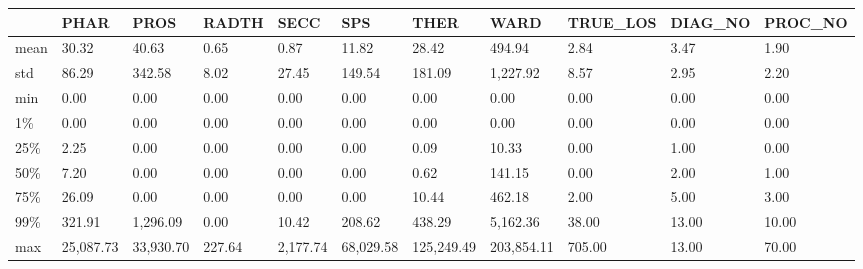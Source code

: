 \begin{tabular}{lllllllllll}
\toprule
{} &       PHAR &       PROS &   RADTH &      SECC &        SPS &        THER &        WARD & TRUE\_LOS & DIAG\_NO & PROC\_NO \\
\midrule
mean &      30.32 &      40.63 &    0.65 &      0.87 &      11.82 &       28.42 &      494.94 &     2.84 &    3.47 &    1.90 \\
std  &      86.29 &     342.58 &    8.02 &     27.45 &     149.54 &      181.09 &    1,227.92 &     8.57 &    2.95 &    2.20 \\
min  &       0.00 &       0.00 &    0.00 &      0.00 &       0.00 &        0.00 &        0.00 &     0.00 &    0.00 &    0.00 \\
1\%   &       0.00 &       0.00 &    0.00 &      0.00 &       0.00 &        0.00 &        0.00 &     0.00 &    0.00 &    0.00 \\
25\%  &       2.25 &       0.00 &    0.00 &      0.00 &       0.00 &        0.09 &       10.33 &     0.00 &    1.00 &    0.00 \\
50\%  &       7.20 &       0.00 &    0.00 &      0.00 &       0.00 &        0.62 &      141.15 &     0.00 &    2.00 &    1.00 \\
75\%  &      26.09 &       0.00 &    0.00 &      0.00 &       0.00 &       10.44 &      462.18 &     2.00 &    5.00 &    3.00 \\
99\%  &     321.91 &   1,296.09 &    0.00 &     10.42 &     208.62 &      438.29 &    5,162.36 &    38.00 &   13.00 &   10.00 \\
max  &  25,087.73 &  33,930.70 &  227.64 &  2,177.74 &  68,029.58 &  125,249.49 &  203,854.11 &   705.00 &   13.00 &   70.00 \\
\bottomrule
\end{tabular}
